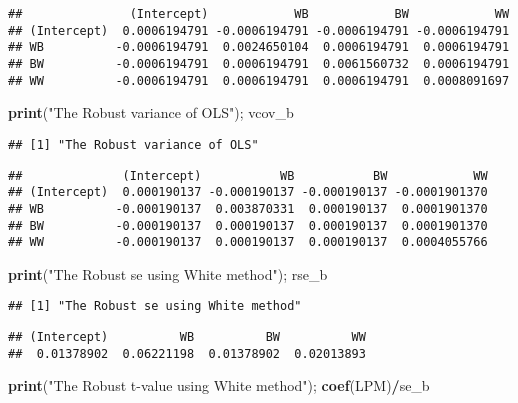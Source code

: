 \documentclass[
  12pt,
]{article}
\newenvironment{Shaded}{\begin{snugshade}}{\end{snugshade}}
\newcommand{\KeywordTok}[1]{\textcolor[rgb]{0.13,0.29,0.53}{\textbf{#1}}}
\newcommand{\NormalTok}[1]{#1}
\newcommand{\OperatorTok}[1]{\textcolor[rgb]{0.81,0.36,0.00}{\textbf{#1}}}
\newcommand{\StringTok}[1]{\textcolor[rgb]{0.31,0.60,0.02}{#1}}
\begin{document}
\begin{verbatim}
##               (Intercept)            WB            BW            WW
## (Intercept)  0.0006194791 -0.0006194791 -0.0006194791 -0.0006194791
## WB          -0.0006194791  0.0024650104  0.0006194791  0.0006194791
## BW          -0.0006194791  0.0006194791  0.0061560732  0.0006194791
## WW          -0.0006194791  0.0006194791  0.0006194791  0.0008091697
\end{verbatim}

\begin{Shaded}
\begin{Highlighting}[]
\KeywordTok{print}\NormalTok{(}\StringTok{"The Robust variance of OLS"}\NormalTok{); vcov\_b}
\end{Highlighting}
\end{Shaded}

\begin{verbatim}
## [1] "The Robust variance of OLS"
\end{verbatim}

\begin{verbatim}
##              (Intercept)           WB           BW            WW
## (Intercept)  0.000190137 -0.000190137 -0.000190137 -0.0001901370
## WB          -0.000190137  0.003870331  0.000190137  0.0001901370
## BW          -0.000190137  0.000190137  0.000190137  0.0001901370
## WW          -0.000190137  0.000190137  0.000190137  0.0004055766
\end{verbatim}

\begin{Shaded}
\begin{Highlighting}[]
\KeywordTok{print}\NormalTok{(}\StringTok{"The Robust se using White method"}\NormalTok{); rse\_b}
\end{Highlighting}
\end{Shaded}

\begin{verbatim}
## [1] "The Robust se using White method"
\end{verbatim}

\begin{verbatim}
## (Intercept)          WB          BW          WW 
##  0.01378902  0.06221198  0.01378902  0.02013893
\end{verbatim}

\begin{Shaded}
\begin{Highlighting}[]
\KeywordTok{print}\NormalTok{(}\StringTok{"The Robust t{-}value using White method"}\NormalTok{); }\KeywordTok{coef}\NormalTok{(LPM)}\OperatorTok{/}\NormalTok{se\_b}
\end{Highlighting}
\end{Shaded}
\end{document}
